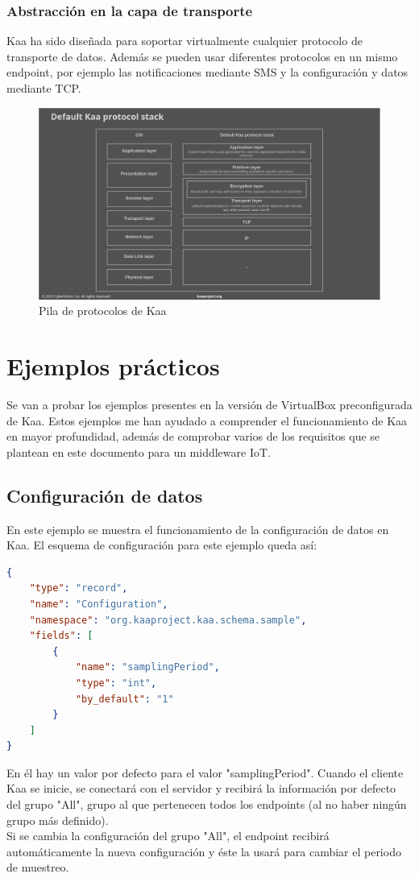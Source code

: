 \documentclass[12pt, twoside]{book}
\begin{document}
\subsubsection*{Abstracción en la capa de transporte}
Kaa ha sido diseñada para soportar virtualmente cualquier protocolo de transporte de datos. Además se pueden usar diferentes protocolos en un mismo endpoint, por ejemplo las notificaciones mediante SMS y la configuración y datos mediante TCP.
\begin{figure}[H]
\centering
\includegraphics[scale=0.3]{images/kaa_stack}
\caption{Pila de protocolos de Kaa}\label{L508}
\end{figure}


\section{Ejemplos prácticos}
Se van a probar los ejemplos  presentes en la versión de VirtualBox preconfigurada de Kaa. Estos ejemplos me han ayudado a comprender el funcionamiento de Kaa en mayor profundidad, además de comprobar varios de los requisitos que se plantean en este documento para un middleware IoT. 

\subsection{Configuración de datos}
En este ejemplo se muestra el funcionamiento de la configuración de datos en Kaa. El esquema de configuración para este ejemplo queda así:
\begin{lstlisting}[language=json]
{
	"type": "record",
	"name": "Configuration",
	"namespace": "org.kaaproject.kaa.schema.sample",
	"fields": [
		{
			"name": "samplingPeriod",
			"type": "int",
			"by_default": "1"
		}
	]
}
\end{lstlisting}
En él hay un valor por defecto para el valor "samplingPeriod". Cuando el cliente Kaa se inicie, se conectará con el servidor y recibirá la información por defecto del grupo "All", grupo al que pertenecen todos los endpoints (al no haber ningún grupo más definido).\\
Si se cambia la configuración del grupo "All", el endpoint recibirá automáticamente la nueva configuración y éste la usará para cambiar el periodo de muestreo.
\end{document}
